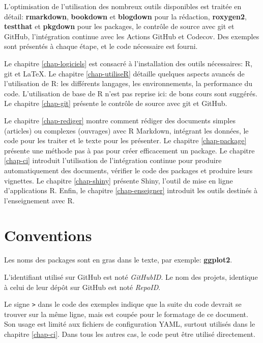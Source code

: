 \documentclass[
  12pt,
  french,
  a4paper,
  extrafontsizes,onecolumn,openright
  ]{memoir}
\newlength{\rf}
\begin{document}
L'optimisation de l'utilisation des nombreux outils disponibles est traitée en détail: \textbf{rmarkdown}, \textbf{bookdown} et \textbf{blogdown} pour la rédaction, \textbf{roxygen2}, \textbf{testthat} et \textbf{pkgdown} pour les packages, le contrôle de source avec git et GitHub, l'intégration continue avec les Actions GitHub et Codecov.
Des exemples sont présentés à chaque étape, et le code nécessaire est fourni.

Le chapitre \ref{chap-logiciels} est consacré à l'installation des outils nécessaires: R, git et LaTeX.
Le chapitre \ref{chap-utiliseR} détaille quelques aspects avancés de l'utilisation de R: les différents langages, les environnements, la performance du code.
L'utilisation de base de R n'est pas reprise ici: de bons cours sont suggérés.
Le chapitre \ref{chap-git} présente le contrôle de source avec git et GitHub.

Le chapitre \ref{chap-rediger} montre comment rédiger des documents simples (articles) ou complexes (ouvrages) avec R Markdown, intégrant les données, le code pour les traiter et le texte pour les présenter.
Le chapitre \ref{chap-package} présente une méthode pas à pas pour créer efficacement un package.
Le chapitre \ref{chap-ci} introduit l'utilisation de l'intégration continue pour produire automatiquement des documents, vérifier le code des packages et produire leurs vignettes.
Le chapitre \ref{chap-shiny} présente Shiny, l'outil de mise en ligne d'applications R.
Enfin, le chapitre \ref{chap-enseigner} introduit les outils destinés à l'enseignement avec R.

\section*{Conventions}\label{conventions}

Les noms des packages sont en gras dans le texte, par exemple: \textbf{ggplot2}.

L'identifiant utilisé sur GitHub est noté \emph{GitHubID}.
Le nom des projets, identique à celui de leur dépôt sur GitHub est noté \emph{RepoID}.

Le signe \texttt{\textbar{}\textgreater{}} dans le code des exemples indique que la suite du code devrait se trouver sur la même ligne, mais est coupée pour le formatage de ce document.
Son usage est limité aux fichiers de configuration YAML, surtout utilisés dans le chapitre \ref{chap-ci}.
Dans tous les autres cas, le code peut être utilisé directement.
\end{document}
